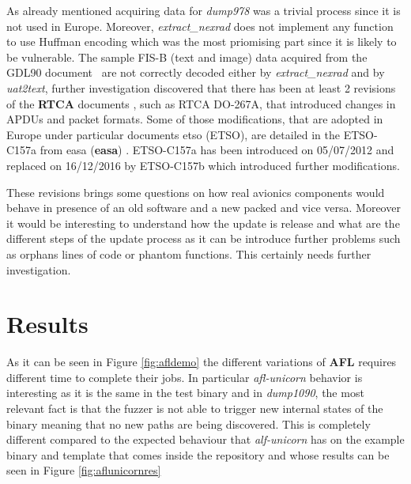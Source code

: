 \documentclass[../main.tex]{subfiles}
\begin{document}
As already mentioned acquiring data for \textit{dump978} was a trivial process since it is not used in Europe. Moreover, \textit{extract\_nexrad} does not implement any function to use Huffman encoding which was the most priomising part since it is likely to be vulnerable. The sample FIS-B (text and image) data acquired from the GDL90 document~\cite{gdl90} are not correctly decoded either by \textit{extract\_nexrad} and by \textit{uat2text}, further investigation discovered that there has been at least 2 revisions of the \textbf{RTCA} documents , such as RTCA DO-267A, that introduced changes in APDUs and packet formats. Some of those modifications, that are adopted in Europe under particular documents \acrlong{etso} (ETSO), are detailed in the ETSO-C157a from \acrlong{easa} (\textbf{\acrshort{easa}}) \cite{easa-all-etso}. ETSO-C157a has been introduced on 05/07/2012 and replaced on 16/12/2016 by ETSO-C157b which introduced further modifications.

These revisions brings some questions on how real avionics components would behave in presence of an old software and a new packed and vice versa. Moreover it would be interesting to understand how the update is release and what are the different steps of the update process as it can be introduce further problems such as orphans lines of code or phantom functions. This certainly needs further investigation.


\section{Results}

As it can be seen in Figure \ref{fig:afldemo} the different variations of \textbf{AFL} requires different time to complete their jobs. In particular \textit{afl-unicorn} behavior is interesting as it is the same in the test binary and in \textit{dump1090}, the most relevant fact is that the fuzzer is not able to trigger new internal states of the binary meaning that no new paths are being discovered. This is completely different compared to the expected behaviour that \textit{alf-unicorn} has on the example binary and template that comes inside the repository and whose results can be seen in Figure \ref{fig:aflunicornres}
\end{document}
